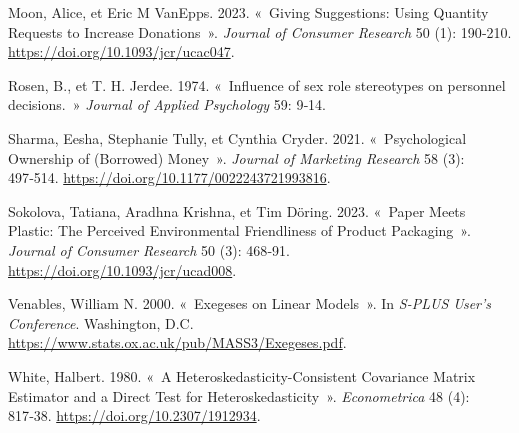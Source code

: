 \documentclass[
  11pt,
  letterpaper,
]{scrbook}
\newlength{\cslhangindent}
\newenvironment{CSLReferences}[2] %
 {\begin{list}{}{%
  \setlength{\itemindent}{0pt}
  \setlength{\leftmargin}{0pt}
  \setlength{\parsep}{0pt}
  \ifodd #1
   \setlength{\leftmargin}{\cslhangindent}
   \setlength{\itemindent}{-1\cslhangindent}
  \fi
  \setlength{\itemsep}{#2\baselineskip}}}
 {\end{list}}
\theoremstyle{plain}
\theoremstyle{plain}
\theoremstyle{definition}
\theoremstyle{definition}
\theoremstyle{remark}
\begin{document}
\begin{CSLReferences}{1}{0}
Moon, Alice, et Eric M VanEpps. 2023. {«~Giving Suggestions: Using
Quantity Requests to Increase Donations~»}. \emph{Journal of Consumer
Research} 50 (1): 190‑210. \url{https://doi.org/10.1093/jcr/ucac047}.

Rosen, B., et T. H. Jerdee. 1974. {«~Influence of sex role stereotypes
on personnel decisions.~»} \emph{Journal of Applied Psychology} 59:
9‑14.

Sharma, Eesha, Stephanie Tully, et Cynthia Cryder. 2021.
{«~Psychological Ownership of (Borrowed) Money~»}. \emph{Journal of
Marketing Research} 58 (3): 497‑514.
\url{https://doi.org/10.1177/0022243721993816}.

Sokolova, Tatiana, Aradhna Krishna, et Tim Döring. 2023. {«~Paper Meets
Plastic: The Perceived Environmental Friendliness of Product
Packaging~»}. \emph{Journal of Consumer Research} 50 (3): 468‑91.
\url{https://doi.org/10.1093/jcr/ucad008}.

Venables, William N. 2000. {«~Exegeses on Linear Models~»}. In
\emph{S-PLUS User's Conference}. Washington, D.C.
\url{https://www.stats.ox.ac.uk/pub/MASS3/Exegeses.pdf}.

White, Halbert. 1980. {«~A Heteroskedasticity-Consistent Covariance
Matrix Estimator and a Direct Test for Heteroskedasticity~»}.
\emph{Econometrica} 48 (4): 817‑38.
\url{https://doi.org/10.2307/1912934}.

\end{CSLReferences}


\backmatter
\end{document}
